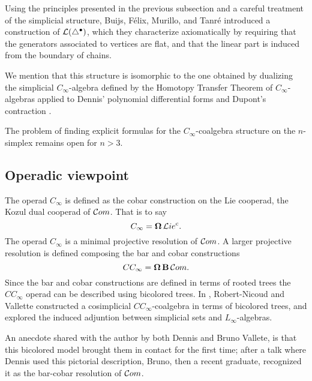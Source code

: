 Using the principles presented in the previous subsection and a careful treatment of the simplicial structure, Buijs, F{\'e}lix, Murillo, and Tanr{\'e} \cite{buijs2020liemodels} introduced a construction of $\mathcal{L}(\triangle^\bullet)$, which they characterize axiomatically by requiring that the generators associated to vertices are flat, and that the linear part is induced from the boundary of chains.

We mention that this structure is isomorphic to the one obtained by dualizing the simplicial $C_\infty$-algebra defined by the Homotopy Transfer Theorem of $C_\infty$-algebras applied to Dennis' polynomial differential forms and Dupont's contraction \cite{getzler2008transfering}.

The problem of finding explicit formulas for the $C_\infty$-coalgebra structure on the $n$-simplex remains open for $n > 3$.

\subsection{Operadic viewpoint}

The operad $C_\infty$ is defined as the cobar construction on the Lie cooperad, the Kozul dual cooperad of $\mathcal{C}om$.
That is to say
\[
C_\infty = \operatorname{\mathbf{\Omega}} \mathcal{L}ie^{\mathrm c}.
\]
The operad $C_\infty$ is a minimal projective resolution of $\mathcal{C}om$.
A larger projective resolution is defined composing the bar and cobar constructions
\[
CC_\infty = \operatorname{\mathbf{\Omega}} \operatorname{\mathbf{B}} \mathcal{C}om.
\]
Since the bar and cobar constructions are defined in terms of rooted trees the $CC_\infty$ operad can be described using bicolored trees.
In \cite{vallette2020higherlietheory}, Robert-Nicoud and Vallette constructed a cosimplicial $CC_\infty$-coalgebra in terms of bicolored trees, and explored the induced adjuntion between simplicial sets and $L_\infty$-algebras.

An anecdote shared with the author by both Dennis and Bruno Vallete, is that this bicolored model brought them in contact for the first time; after a talk where Dennis used this pictorial description, Bruno, then a recent graduate, recognized it as the bar-cobar resolution of $\mathcal{C}om$.